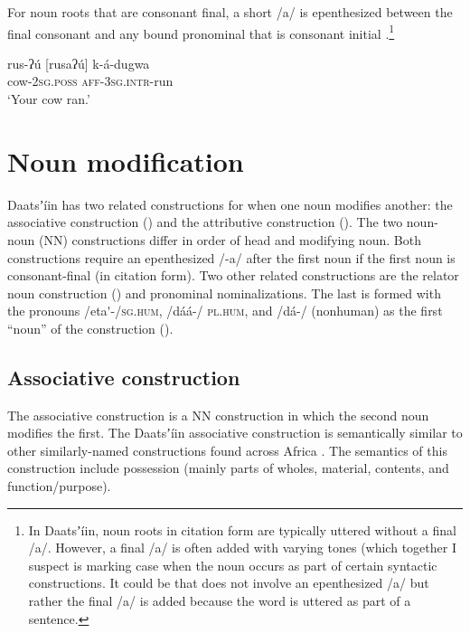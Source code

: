 \documentclass[output=paper]{langsci/langscibook}
\begin{document}
For noun roots that are consonant final, a short /a/ is epenthesized between the final consonant and any bound pronominal that is consonant initial .\footnote{In Daatsʼ\'{i}in, noun roots in citation form are typically uttered without a final /a/.  However, a final /a/ is often added with varying tones (which together I suspect is marking case when the noun occurs as part of certain syntactic constructions. It could be that  does not involve an epenthesized /a/ but rather the final /a/ is added because the word is uttered as part of a sentence. }

\ea\label{ex:ahlandc:49}
\gll
{rus-ʔ\'{u} [rusaʔ\'{u}]}     k-\'{a}-dugwa \\
cow-\textsc{2sg.poss}     \textsc{aff-3sg.intr}{}-run \\
\glt
‘Your cow ran.’
\z


\section{Noun modification}\label{sec:ahlandc:8}


Daatsʼ\'{i}in has two related constructions for when one noun modifies another: the associative construction () and the attributive construction (). The two noun-noun (NN) constructions differ in order of head and modifying noun. Both constructions require an epenthesized /-a/ after the first noun if the first noun is consonant-final (in citation form). Two other related constructions are the relator noun construction () and pronominal nominalizations. The last is formed with the pronouns /eta\'{ }{}-/\textsc{sg.hum}, /d\'{a}\'{a}-/ \textsc{pl.hum}, and /d\'{a}-/ (nonhuman) as the first “noun” of the construction ().


\subsection{Associative construction}\label{sec:ahlandc:8.1}

The associative construction is a NN construction in which the second noun modifies the first. The Daatsʼ\'{i}in associative construction is semantically similar to other similarly-named constructions found across Africa \citep[275-276]{Welmers1974}. The semantics of this construction include possession (mainly parts of wholes, material, contents, and function/purpose). 
\end{document}
